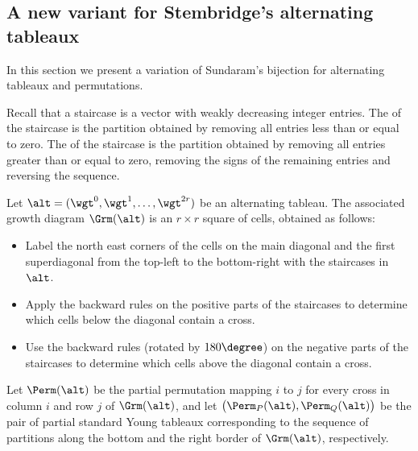 \subsection{A new variant for Stembridge's alternating tableaux}
\label{sec:Stembridge}

In this section we present a variation of Sundaram's bijection for
alternating tableaux and permutations.

Recall that a staircase is a vector with weakly decreasing integer
entries. The  of the staircase is the partition
obtained by removing all entries less than or equal to zero. The
 of the staircase is the partition obtained by
removing all entries greater than or equal to zero, removing the
signs of the remaining entries and reversing the sequence.
\begin{defi}\label{defn:P}
 Let $\alt=(\wgt^0,\wgt^1,\ldots,\wgt^{2r})$ be an alternating
 tableau. The associated growth diagram $\Grm(\alt)$ is an
 $r\times r$ square of cells, obtained as follows:
 \begin{itemize}\setlength{\itemsep}{0pt}
 \item[P1] Label the north east corners of the cells on the main diagonal and
 the first superdiagonal from the top-left to the bottom-right
 with the staircases in $\alt$.
 \item[P2] Apply the backward rules on the positive parts of the
 staircases to determine which cells below the diagonal contain a
 cross.
 \item[P3] Use the backward rules (rotated by $180\degree$) on the
 negative parts of the staircases to determine which cells above
 the diagonal contain a cross.
 \end{itemize}

 Let $\Perm(\alt)$ be the partial permutation mapping $i$ to $j$ for
 every cross in column $i$ and row $j$ of $\Grm(\alt)$, and let
 $\big(\Perm_P(\alt), \Perm_Q(\alt)\big)$ be the pair of partial
 standard Young tableaux corresponding to the sequence of partitions
 along the bottom and the right border of $\Grm(\alt)$, respectively.
\end{defi}
